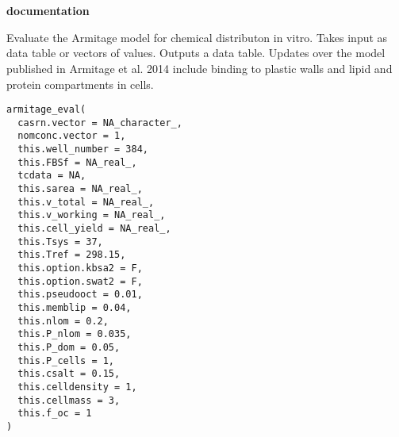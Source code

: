 \documentclass[a4paper]{book}
\begin{document}
\chapter*{}
\begin{center}
{\textbf{\huge \R{} documentation}} \par{}
\par\bigskip{\large \today}
\end{center}
%
\begin{Description}\relax
Evaluate the Armitage model for chemical distributon in vitro. Takes input
as data table or vectors of values. Outputs a data table. Updates over
the model published in Armitage et al. 2014 include binding to plastic walls
and lipid and protein compartments in cells.
\end{Description}
%
\begin{Usage}
\begin{verbatim}
armitage_eval(
  casrn.vector = NA_character_,
  nomconc.vector = 1,
  this.well_number = 384,
  this.FBSf = NA_real_,
  tcdata = NA,
  this.sarea = NA_real_,
  this.v_total = NA_real_,
  this.v_working = NA_real_,
  this.cell_yield = NA_real_,
  this.Tsys = 37,
  this.Tref = 298.15,
  this.option.kbsa2 = F,
  this.option.swat2 = F,
  this.pseudooct = 0.01,
  this.memblip = 0.04,
  this.nlom = 0.2,
  this.P_nlom = 0.035,
  this.P_dom = 0.05,
  this.P_cells = 1,
  this.csalt = 0.15,
  this.celldensity = 1,
  this.cellmass = 3,
  this.f_oc = 1
)
\end{verbatim}
\end{Usage}
%
\end{document}
